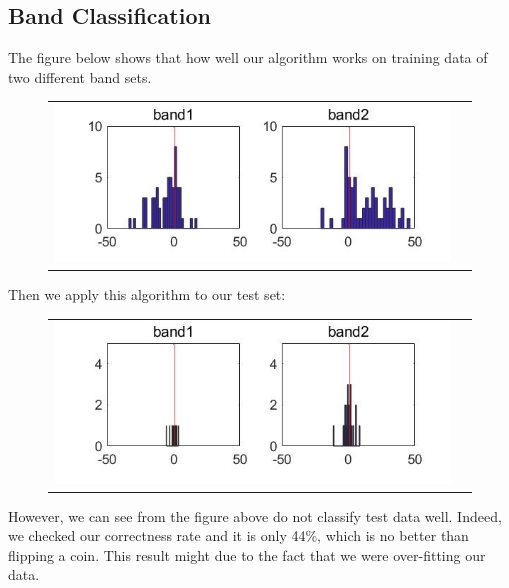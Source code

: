 \documentclass[12pt]{article}
\begin{document}
\subsection{Band Classification}
The figure below shows that how well our algorithm works on training data of two different band sets.
\begin{figure}[H]
\begin{tabular}{cc}
  \includegraphics[width=\textwidth]{2band.jpg}
\end{tabular}
\end{figure}
Then we apply this algorithm to our test set:
\begin{figure}[H]
\begin{tabular}{cc}
  \includegraphics[width=\textwidth]{2band_test.jpg}
\end{tabular}
\end{figure}
However, we can see from the figure above do not classify test data well. Indeed, we checked our correctness rate and it is only 44\%, which is no better than flipping a coin. This result might due to the fact that we were over-fitting our data.
\end{document}
